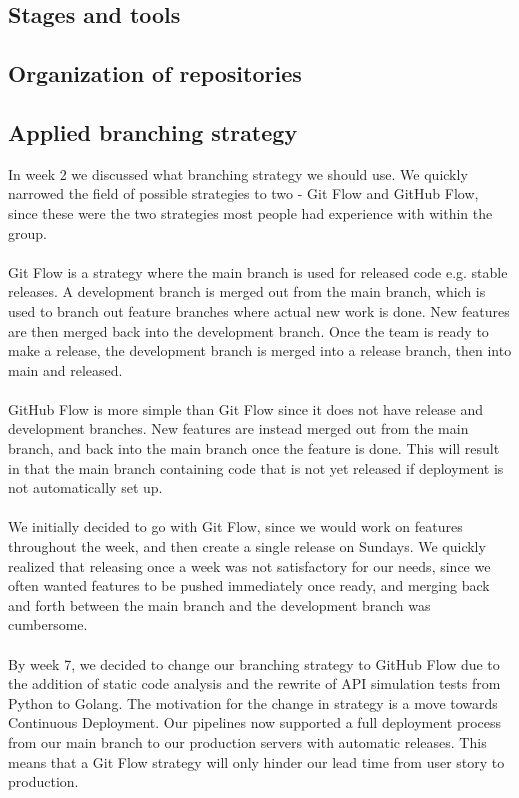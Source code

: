 \subsection{Stages and tools}
\subsection{Organization of repositories}
\subsection{Applied branching strategy}
In week 2 we discussed what branching strategy we should use. We quickly narrowed the field of possible strategies to two - Git Flow and GitHub Flow, since these were the two strategies most people had experience with within the group. 
\\\\
Git Flow is a strategy where the main branch is used for released code e.g. stable releases. A development branch is merged out from the main branch, which is used to branch out feature branches where actual new work is done. New features are then merged back into the development branch. Once the team is ready to make a release, the development branch is merged into a release branch, then into main and released.
\\\\
GitHub Flow is more simple than Git Flow since it does not have release and development branches. New features are instead merged out from the main branch, and back into the main branch once the feature is done. This will result in that the main branch containing code that is not yet released if deployment is not automatically set up.
\\\\
We initially decided to go with Git Flow, since we would work on features throughout the week, and then create a single release on Sundays. We quickly realized that releasing once a week was not satisfactory for our needs, since we often wanted features to be pushed immediately once ready, and merging back and forth between the main branch and the development branch was cumbersome.
\\\\
By week 7, we decided to change our branching strategy to GitHub Flow due to the addition of static code analysis and the rewrite of API simulation tests from Python to Golang. The motivation for the change in strategy is a move towards Continuous Deployment. Our pipelines now supported a full deployment process from our main branch to our production servers with automatic releases. This means that a Git Flow strategy will only hinder our lead time from user story to production.

